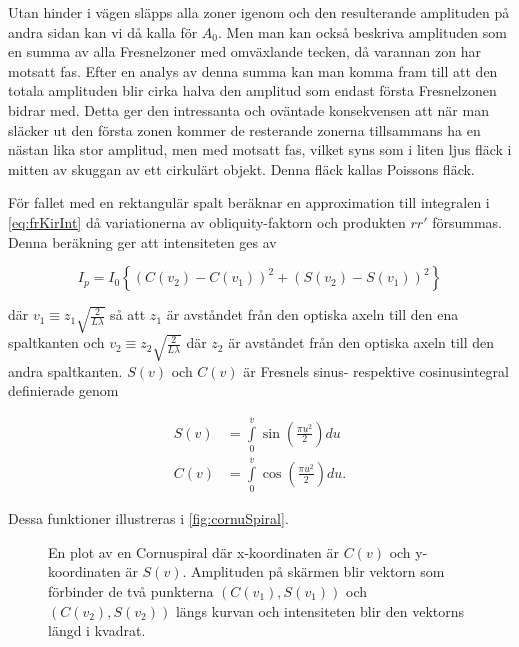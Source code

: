 \documentclass[a4paper]{article}
\begin{document}
Utan hinder i vägen släpps alla zoner igenom och den resulterande amplituden på andra sidan kan vi då kalla för $A_0$. Men man kan också beskriva amplituden som en summa av alla Fresnelzoner med omväxlande tecken, då varannan zon har motsatt fas. Efter en analys av denna summa kan man komma fram till att den totala amplituden blir cirka halva den amplitud som endast första Fresnelzonen bidrar med. Detta ger den intressanta och oväntade konsekvensen att när man släcker ut den första zonen kommer de resterande zonerna tillsammans ha en nästan lika stor amplitud, men med motsatt fas, vilket syns som i liten ljus fläck i mitten av skuggan av ett cirkulärt objekt. Denna fläck kallas Poissons fläck.
\cite{pearsonIntroOpt}

För fallet med en rektangulär spalt beräknar \cite[pp.~340--342]{pearsonIntroOpt} en approximation till integralen i \eqref{eq:frKirInt} då variationerna av obliquity-faktorn och produkten $r r'$ försummas. Denna beräkning ger att intensiteten ges av

\begin{equation}
	I_p = I_0 \left\{\left(C(v_2) - C(v_1)\right)^2 + \left(S(v_2) - S(v_1)\right)^2\right\}
	\label{eq:rectApFre}
\end{equation}

där $v_1\equiv z_1\sqrt{\frac{2}{L\lambda}}$ så att $z_1$ är avståndet från den optiska axeln till den ena spaltkanten och $v_2\equiv z_2\sqrt{\frac{2}{L\lambda}}$ där $z_2$ är avståndet från den optiska axeln till den andra spaltkanten. $S(v)$ och $C(v)$ är Fresnels sinus- respektive cosinusintegral definierade genom

\begin{align}
	S(v) &= \int\limits_0^v \sin\left(\frac{\pi u^2}{2}\right) d u \\
	C(v) &= \int\limits_0^v \cos\left(\frac{\pi u^2}{2}\right) d u\text{.}
\end{align}

Dessa funktioner illustreras i \autoref{fig:cornuSpiral}.

\begin{figure}[ht]
	\centering
	\caption{En plot av en Cornuspiral där x-koordinaten är $C(v)$ och y-koordinaten är $S(v)$. Amplituden på skärmen blir vektorn som förbinder de två punkterna $(C(v_1), S(v_1))$ och $(C(v_2), S(v_2))$ längs kurvan och intensiteten blir den vektorns längd i kvadrat.}
	\label{fig:cornuSpiral}
\end{figure}
\end{document}
